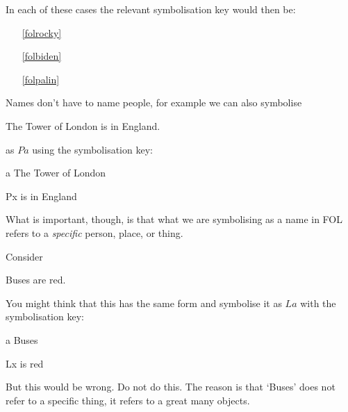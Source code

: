 In each of these cases the relevant symbolisation key would then be:
\begin{enumerate}
\item[\ref{folrocky}] 
\item[\ref{folbiden}] 
\item[\ref{folpalin}] 
\end{enumerate}
Names don't have to name people, for example we can also symbolise
\begin{earg}
\item[\ex{foltower}] The Tower of London is in England.
\end{earg}
as $Pa$ using the symbolisation key:
\begin{ekey}
\item[a] The Tower of London
\item[Px]  is in England
\end{ekey}
What is important, though, is that what we are symbolising as a name in FOL refers to a \emph{specific} person, place, or thing.

Consider
\begin{earg}
\item[\ex{folbuses}] Buses are red.
\end{earg}
You might think that this has the same form and symbolise it as $La$ with the symbolisation key:
\begin{ekey}
\item[a] Buses
\item[Lx]  is red
\end{ekey}
But this would be wrong. Do not do this. The reason  is that `Buses' does not refer to a specific thing, it refers to a great many objects.

